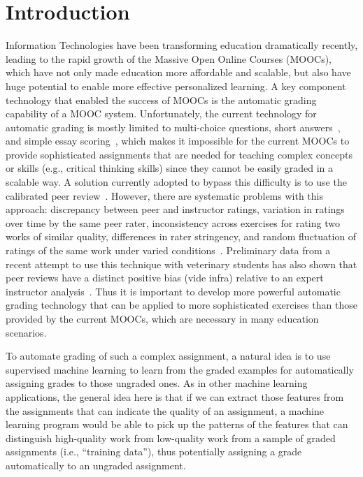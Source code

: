 \def\ignore#1{}
\section{Introduction}

Information Technologies have been transforming education dramatically
recently, leading to the rapid growth of the Massive Open Online Courses
(MOOCs), which have not only made education more affordable and scalable,
but also have huge potential to enable more effective personalized
learning.  A key component technology that enabled the success of MOOCs is
the automatic grading capability of a MOOC system. Unfortunately, the
current technology for automatic grading is mostly limited to multi-choice
questions, short answers~\cite{Brooks:2014:Powergrading,
Leacock:2003:CatH, Mitchell:2002:ICAA, Pulman:2005:EdAppsNLP,
Mohler:2009:EACL}, and simple essay scoring~\cite{Chen:2014:IRRODL,
Balfour:2013}, which makes it impossible for the current MOOCs to provide
sophisticated assignments that are needed for teaching complex concepts or
skills (e.g., critical thinking skills) since they cannot be easily graded
in a scalable way. A solution currently adopted to bypass this difficulty
is to use the calibrated peer review~\cite{Balfour:2013, Chen:2014:IRRODL,
Sandeen:2013, Suen:2014}.  However, there are systematic problems with this
approach: discrepancy between peer and instructor ratings, variation in
ratings over time by the same peer rater, inconsistency across exercises
for rating two works of similar quality, differences in rater stringency,
and random fluctuation of ratings of the same work under varied
conditions~\cite{Suen:2014}.  Preliminary data from a recent attempt to use
this technique with veterinary students has also shown that peer reviews
have a distinct positive bias (vide infra) relative to an expert instructor
analysis~\cite{Ferguson:2014}.  Thus it is important to develop more
powerful automatic grading technology that can be applied to more
sophisticated exercises than those provided by the current MOOCs, which are
necessary in many education scenarios.

To automate grading of such a complex assignment, a natural idea is to use
supervised machine learning to learn from the graded examples for
automatically assigning grades to those ungraded ones. As in other machine
learning applications, the general idea here is that if we can extract
those features from the assignments that can indicate the quality of an
assignment, a machine learning program would be able to pick up the
patterns of the features that can distinguish high-quality work from
low-quality work from a sample of graded assignments (i.e., ``training
data''), thus potentially assigning a grade automatically to an ungraded
assignment.

